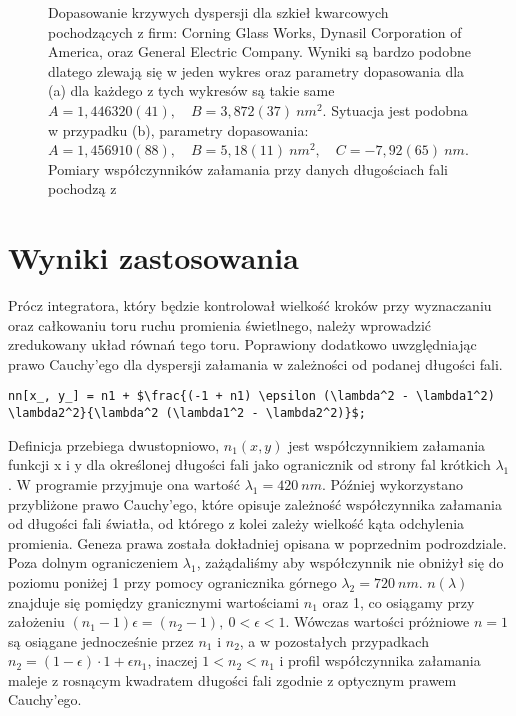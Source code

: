 \begin{figure}[htb]
    \centering
    \caption{Dopasowanie krzywych dyspersji dla szkieł kwarcowych pochodzących z firm: Corning Glass Works, Dynasil Corporation of America, oraz General Electric Company. Wyniki są bardzo podobne dlatego zlewają się w jeden wykres oraz parametry dopasowania dla (a) dla każdego z tych wykresów są takie same $A=1,446320(41), \quad B=3,872(37)~nm^2$. Sytuacja jest podobna w przypadku (b), parametry dopasowania: $A=1,456910(88),\quad B=5,18(11)~nm^2,\quad C=-7,92(65)~nm$. Pomiary współczynników załamania przy danych długościach fali pochodzą z \cite{malitson1965interspecimen}}
\end{figure}
\newpage
\section{Wyniki zastosowania}
\indent Prócz integratora, który będzie kontrolował wielkość kroków przy wyznaczaniu oraz całkowaniu toru ruchu promienia świetlnego, należy wprowadzić zredukowany układ równań tego toru. Poprawiony dodatkowo uwzględniając prawo Cauchy'ego dla dyspersji załamania w zależności od podanej długości fali.
\begin{center}
\begin{lstlisting}
nn[x_, y_] = n1 + $\frac{(-1 + n1) \epsilon (\lambda^2 - \lambda1^2) \lambda2^2}{\lambda^2 (\lambda1^2 - \lambda2^2)}$;
\end{lstlisting}
\end{center}
Definicja przebiega dwustopniowo, $n_1(x,y)$ jest współczynnikiem załamania funkcji x i y dla określonej długości fali jako ogranicznik od strony fal krótkich $\lambda_1$. W programie przyjmuje ona wartość $\lambda_1 = 420~nm$. Później wykorzystano przybliżone prawo Cauchy'ego, które opisuje zależność współczynnika załamania od długości fali światła, od którego z kolei zależy wielkość kąta odchylenia promienia. Geneza prawa została dokładniej opisana w poprzednim podrozdziale.
Poza dolnym ograniczeniem $\lambda_1$, zażądaliśmy aby współczynnik nie obniżył się do poziomu poniżej 1 przy pomocy ogranicznika górnego $\lambda_2=720~nm$. $n(\lambda)$ znajduje się pomiędzy granicznymi wartościami $n_1$ oraz 1, co osiągamy przy założeniu $(n_1-1)\epsilon=(n_2-1),~0<\epsilon<1$. Wówczas wartości próżniowe $n=1$ są osiągane jednocześnie przez $n_1$ i $n_2$, a w pozostałych przypadkach $n_2=(1-\epsilon)\cdot 1+\epsilon n_1$, inaczej $1<n_2<n_1$ i profil współczynnika załamania maleje z rosnącym kwadratem długości fali zgodnie z optycznym prawem Cauchy'ego.

